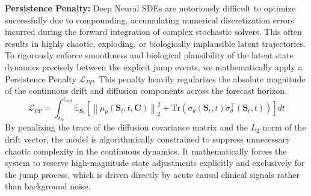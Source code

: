 \textbf{Persistence Penalty:} Deep Neural SDEs are notoriously difficult to optimize successfully due to compounding, accumulating numerical discretization errors incurred during the forward integration of complex stochastic solvers. This often results in highly chaotic, exploding, or biologically implausible latent trajectories. To rigorously enforce smoothness and biological plausibility of the latent state dynamics precisely between the explicit jump events, we mathematically apply a Persistence Penalty $\mathcal{L}_{PP}$. This penalty heavily regularizes the absolute magnitude of the continuous drift and diffusion components across the forecast horizon.
\begin{equation}
\mathcal{L}_{PP} = \int_{t_N}^{t_{end}} \mathbb{E}_{\mathbf{S}_t} \left[ \left\| \mu_\theta(\mathbf{S}_t, t, \mathbf{C}) \right\|_2^2 + \text{Tr}\left( \sigma_\theta(\mathbf{S}_t, t) \sigma_\theta^\top(\mathbf{S}_t, t) \right) \right] dt
\end{equation}
By penalizing the trace of the diffusion covariance matrix and the $L_2$ norm of the drift vector, the model is algorithmically constrained to suppress unnecessary chaotic complexity in the continuous dynamics. It mathematically forces the system to reserve high-magnitude state adjustments explicitly and exclusively for the jump process, which is driven directly by acute causal clinical signals rather than background noise.
